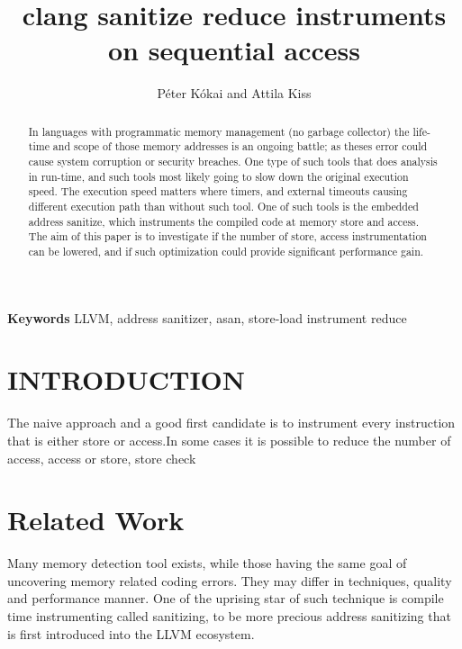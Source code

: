 \documentclass[letterpaper, 10 pt, conference]{ieeeconf}  %
\title{\LARGE \bf
clang sanitize reduce instruments on sequential access
}
\author{P\'eter K\'okai and Attila Kiss}
\let\cite\parencite
\begin{document}
\maketitle
\thispagestyle{empty}
\pagestyle{empty}


\begin{abstract}
In languages with programmatic memory management (no garbage collector) the life-time and scope of those memory addresses is an ongoing battle; as theses error could cause system corruption or security breaches. One type of such tools that does analysis in run-time, and such tools most likely going to slow down the original execution speed. The execution speed matters where timers, and external timeouts causing different execution path than without such tool. One of such tools is the embedded address sanitize, which instruments the compiled code at memory store and access. The aim of this paper is to investigate if the number of store, access instrumentation can be lowered, and if such optimization could provide significant performance gain.
\end{abstract} \hspace{10pt}

\small \textbf{Keywords} LLVM, address sanitizer, asan, store-load instrument reduce

\section{INTRODUCTION}
The naive approach and a good first candidate is to instrument every instruction that is either store or access.In some cases it is possible to reduce the number of access, access or store, store check

\section{Related Work}
Many memory detection tool exists, while those having the same goal of uncovering memory related coding errors. They may differ in techniques, quality and performance manner. One of the uprising star of such technique is compile time instrumenting called sanitizing, to be more precious address sanitizing \cite{serebryany2012addresssanitizer} that is first introduced into the LLVM\cite{lattner2004llvm}\cite{lattner2006introduction}\cite{lattner2007llvm} ecosystem.
\end{document}
